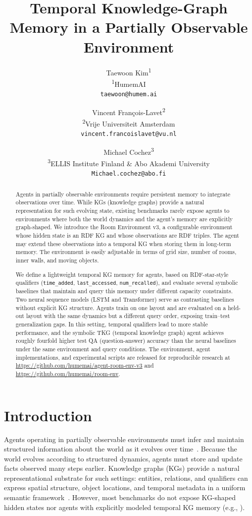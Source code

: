 \documentclass[11pt]{article}
\title{Temporal Knowledge-Graph Memory in a Partially Observable Environment}
\author{
	Taewoon Kim\textsuperscript{\rm 1}\\
	\textsuperscript{\rm 1}HumemAI\\
	\texttt{taewoon@humem.ai}
	\and
	Vincent François-Lavet\textsuperscript{\rm 2}\\
	\textsuperscript{\rm 2}Vrije Universiteit Amsterdam\\
	\texttt{vincent.francoislavet@vu.nl}
	\and
	Michael Cochez\textsuperscript{\rm 3}\\
	\textsuperscript{\rm 3}ELLIS Institute Finland \& Abo Akademi University\\
	\texttt{Michael.cochez@abo.fi}
}
\begin{document}
\maketitle

\begin{abstract}
Agents in partially observable environments require persistent memory to integrate observations over time. While KGs (knowledge graphs) provide a natural representation for such evolving state, existing benchmarks rarely
expose agents to environments where both the world dynamics and the
    agent’s memory are explicitly graph-shaped. We introduce the Room Environment v3, a configurable environment whose hidden state is an RDF KG and whose observations are RDF triples.
The agent may extend these observations into a temporal KG when storing
them in long-term memory. The environment is easily adjustable in terms of grid
size, number of rooms, inner walls, and moving objects.

We define a lightweight temporal KG memory for agents, based on
RDF-star-style qualifiers (\texttt{time\_added},
\texttt{last\_accessed}, \texttt{num\_recalled}), and evaluate several
symbolic baselines that maintain and query this memory under different
capacity constraints. Two neural sequence models (LSTM and Transformer) serve as contrasting baselines without explicit KG structure. Agents train on one layout and are evaluated on a held-out layout with the same dynamics but a different query order, exposing train–test generalization gaps. In this setting, temporal qualifiers lead to more
stable performance, and the symbolic TKG (temporal knowledge graph) agent achieves roughly fourfold higher test QA (question-answer) accuracy than the neural baselines under the same environment and query conditions. The environment, agent implementations, and
experimental scripts are released for reproducible research at
\url{https://github.com/humemai/agent-room-env-v3} and \url{https://github.com/humemai/room-env}.

\end{abstract}

\section{Introduction}

Agents operating in partially observable environments must infer and maintain structured information about the world as it evolves over time~\cite{KAELBLING199899}. Because the world evolves according to structured dynamics, agents must store and update facts observed many steps earlier. Knowledge graphs (KGs)
provide a natural representational substrate for such settings: entities,
relations, and qualifiers can express spatial structure, object
locations, and temporal metadata in a uniform semantic framework~\cite{ehrlinger2016towards,Hogan_2021,battaglia2018relationalinductivebiasesdeep,zambaldi2018relationaldeepreinforcementlearning}. However, most benchmarks do not expose KG-shaped hidden states nor agents with explicitly modeled temporal KG memory (e.g., \cite{battaglia2018relationalinductivebiasesdeep,zambaldi2018relationaldeepreinforcementlearning,Cote2018TextWorld,Hausknecht2020Jericho,Ammanabrolu2020Graph,Wayne2018MERLIN,graves2014neural,graves2016hybrid}).
\end{document}
